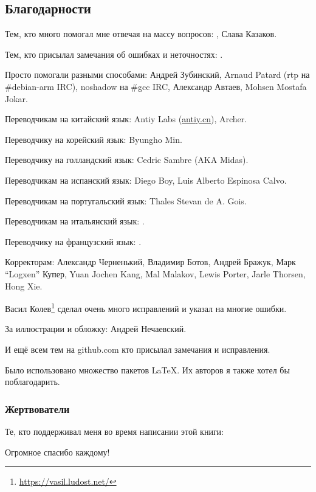 \subsection*{Благодарности}

Тем, кто много помогал мне отвечая на массу вопросов: \HERMIT, Слава  Казаков.

Тем, кто присылал замечания об ошибках и неточностях: \PeopleMistakesInaccuracies{}.

Просто помогали разными способами:
Андрей Зубинский,
Arnaud Patard (rtp на \#debian-arm IRC),
noshadow на \#gcc IRC,
Александр Автаев,
Mohsen Mostafa Jokar.

Переводчикам на китайский язык:
Antiy Labs (\href{http://antiy.cn}{antiy.cn}), Archer.

Переводчику на корейский язык: Byungho Min.

Переводчику на голландский язык: Cedric Sambre (AKA Midas).

Переводчикам на испанский язык: Diego Boy, Luis Alberto Espinosa Calvo.

Переводчикам на португальский язык: Thales Stevan de A. Gois.

Переводчикам на итальянский язык: \PeopleItalianTranslators{}.

Переводчику на французский язык: \PeopleFrenchTranslators{}.

Корректорам:
Александр  Черненький,
Владимир Ботов,
Андрей Бражук,
Марк ``Logxen'' Купер, Yuan Jochen Kang, Mal Malakov, Lewis Porter, Jarle Thorsen, Hong Xie.

Васил Колев\footnote{\url{https://vasil.ludost.net/}} сделал очень много исправлений и указал на многие ошибки.

За иллюстрации и обложку: Андрей Нечаевский.

И ещё всем тем на github.com кто присылал замечания и исправления.

Было использовано множество пакетов \LaTeX. Их авторов я также хотел бы поблагодарить.

\subsubsection*{Жертвователи}

Те, кто поддерживал меня во время написании этой книги:



Огромное спасибо каждому!

